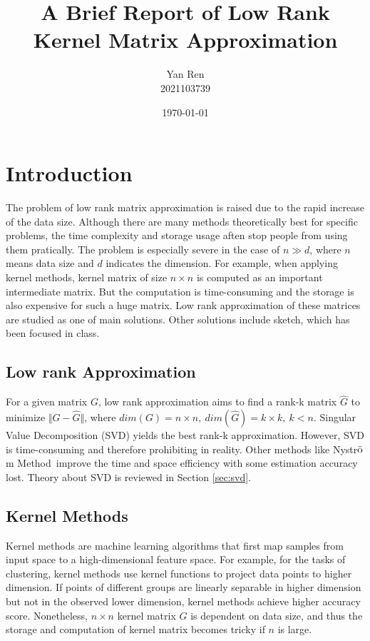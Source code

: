 \documentclass[12pt, a4paper, oneside]{article}
\title{\textbf{A Brief Report of Low Rank Kernel Matrix Approximation}}
\author{Yan Ren \\ 2021103739}
\date{\today}
\newcommand{\nysm}{Nystr$\ddot{\rm o}$m Method}
\begin{document}
	
\maketitle
\newpage
\tableofcontents
\newpage

\section{Introduction} %
\label{sec:i}

The problem of low rank matrix approximation is raised due to the rapid increase of the data size. Although there are many methods theoretically best for specific problems, the time complexity and storage usage aften stop people from using them pratically. The problem is especially severe in the case of $n \gg d$, where $n$ means data size and $d$ indicates the dimension. For example, when applying kernel methods, kernel matrix of size $n \times n$ is computed as an important intermediate matrix. But the computation is time-consuming and the storage is also expensive for such a huge matrix. Low rank approximation of these matrices are studied as one of main solutions. Other solutions include sketch, which has been focused in class.

\subsection{Low rank Approximation}
\label{subsec:lra}

For a given matrix $G$, low rank approximation aims to find a rank-k matrix $\hat{G}$ to minimize $\Vert G - \hat{G} \Vert $, where $dim(G) = n\times n,\ dim(\hat{G}) = k \times k,\ k < n$. Singular Value Decomposition (SVD) yields the best rank-k approximation. However, SVD is time-consuming and therefore prohibiting in reality. Other methods like \nysm\ improve the time and space efficiency with some estimation accuracy lost. Theory about SVD is reviewed in Section \ref{sec:svd}.


\subsection{Kernel Methods}
\label{subsec:km}

Kernel methods \cite{kernel} are machine learning algorithms
that first map samples from input space to a high-dimensional feature space. For example, for the tasks of clustering, kernel methods use kernel functions to project data points to higher dimension. If points of different groups are linearly separable in higher dimension but not in the observed lower dimension, kernel methods achieve higher accuracy score. Nonetheless, $n\times n$ kernel matrix $G$ is dependent on data size, and thus the storage and computation of kernel matrix becomes tricky if $n$ is large. 
\end{document}
